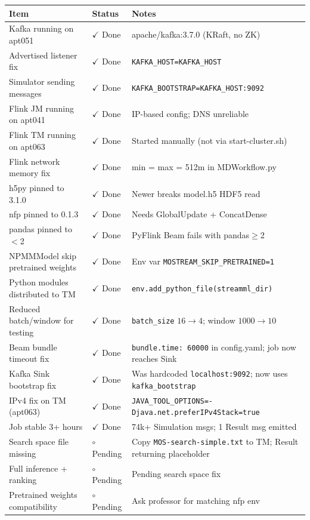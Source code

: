 \documentclass[11pt,a4paper]{article}
\newcommand{\itemdone}{\textcolor{statusdone}{$\checkmark$ Done}}
\newcommand{\itempending}{\textcolor{statuspending}{$\circ$ Pending}}
\begin{document}
\begin{tabular}{p{6.5cm}ll}
  \toprule
  Item & Status & Notes \\
  \midrule
  Kafka running on apt051               & \itemdone    & apache/kafka:3.7.0 (KRaft, no ZK) \\
  Advertised listener fix               & \itemdone    & \texttt{KAFKA\_HOST=KAFKA_HOST} \\
  Simulator sending messages            & \itemdone    & \texttt{KAFKA\_BOOTSTRAP=KAFKA_HOST:9092} \\
  Flink JM running on apt041            & \itemdone    & IP-based config; DNS unreliable \\
  Flink TM running on apt063            & \itemdone    & Started manually (not via start-cluster.sh) \\
  Flink network memory fix              & \itemdone    & min = max = 512m in MDWorkflow.py \\
  h5py pinned to 3.1.0                  & \itemdone    & Newer breaks model.h5 HDF5 read \\
  nfp pinned to 0.1.3                   & \itemdone    & Needs GlobalUpdate + ConcatDense \\
  pandas pinned to $<$2                 & \itemdone    & PyFlink Beam fails with pandas$\geq$2 \\
  NPMMModel skip pretrained weights     & \itemdone    & Env var \texttt{MOSTREAM\_SKIP\_PRETRAINED=1} \\
  Python modules distributed to TM     & \itemdone    & \texttt{env.add\_python\_file(streamml\_dir)} \\
  Reduced batch/window for testing      & \itemdone    & \texttt{batch\_size} $16\to4$; window $1000\to10$ \\
  Beam bundle timeout fix               & \itemdone    & \texttt{bundle.time: 60000} in config.yaml; job now reaches Sink \\
  Kafka Sink bootstrap fix              & \itemdone    & Was hardcoded \texttt{localhost:9092}; now uses \texttt{kafka\_bootstrap} \\
  IPv4 fix on TM (apt063)              & \itemdone    & \texttt{JAVA\_TOOL\_OPTIONS=-Djava.net.preferIPv4Stack=true} \\
  Job stable 3+ hours                  & \itemdone    & 74k+ Simulation msgs; 1 Result msg emitted \\
  Search space file missing             & \itempending & Copy \texttt{MOS-search-simple.txt} to TM; Result returning placeholder \\
  Full inference + ranking              & \itempending & Pending search space fix \\
  Pretrained weights compatibility      & \itempending & Ask professor for matching nfp env \\
  \bottomrule
\end{tabular}
\end{document}
